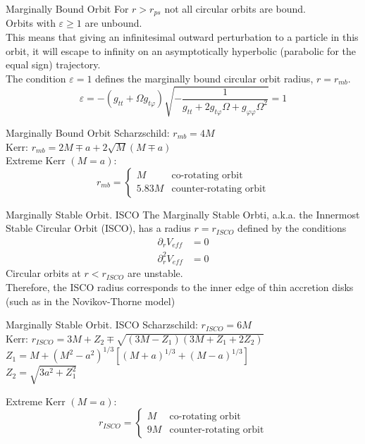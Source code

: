 \documentclass{beamer}
\begin{document}
\begin{frame}{Marginally Bound Orbit}
	For $r>r_{ps}$ not all circular orbits are bound.\\
	\pause
	Orbits with $\varepsilon \geq 1$ are unbound.\\
	\pause
	This means that giving an infinitesimal outward perturbation to a particle in this orbit, it will escape to infinity on an asymptotically hyperbolic (parabolic for the equal sign) trajectory.\\
	\pause
	The condition $\varepsilon =1$ defines the marginally bound circular orbit radius, $r=r_{mb}$.
	\pause
	\[ \varepsilon = - \left( g_{tt} + \Omega g_{t\varphi} \right) \sqrt{-\frac{1}{ g_{tt}  + 2g_{t \varphi} \Omega  + g_{\varphi \varphi} \Omega^2 }}=1 \]
\end{frame}

\begin{frame}{Marginally Bound Orbit}
	Scharzschild: $r_{mb} = 4M$\\
	\bigskip	
	\pause
	Kerr: $r_{mb} = 2M\mp a + 2\sqrt{M} \left(M \mp a \right) $\\
	\bigskip	
	\pause
	Extreme Kerr $(M=a)$: 
	\[r_{mb} = 
	\begin{cases}
	M & \textrm{co-rotating orbit}\\
	5.83M & \textrm{counter-rotating orbit}
	\end{cases} \]
\end{frame}

\begin{frame}{Marginally Stable Orbit. ISCO}
	The Marginally Stable Orbti, a.k.a. the Innermost Stable Circular Orbit (ISCO), has a radius $r=r_{ISCO}$ defined by the conditions\\
	\pause
	\begin{align*}
	\partial_r V_{eff} &= 0 \\
	\partial_r^2 V_{eff} &= 0
	\end{align*}	 
	Circular orbits at $r<r_{ISCO}$ are unstable.\\
	\pause
	Therefore, the ISCO radius corresponds to the inner edge of thin accretion disks (such as in the Novikov-Thorne model)
\end{frame}

\begin{frame}{Marginally Stable Orbit. ISCO}
	Scharzschild: $r_{ISCO} = 6M$\\
	\bigskip	
	\pause
	Kerr: $r_{ISCO} = 3M + Z_2 \mp \sqrt{(3M-Z_1)(3M+Z_1+2Z_2)} $\\
	\bigskip
	\pause
	$Z_1 = M + (M^2-a^2)^{1/3} [(M+a)^{1/3} + (M-a)^{1/3} ]$\\
	\pause
	$Z_2 = \sqrt{3a^2 +Z_1^2} $
	\bigskip	
	\pause
	
	Extreme Kerr $(M=a)$: 
	\[r_{ISCO} = 
	\begin{cases}
	M & \textrm{co-rotating orbit}\\
	9M & \textrm{counter-rotating orbit}
	\end{cases} \]
\end{frame}
\end{document}
